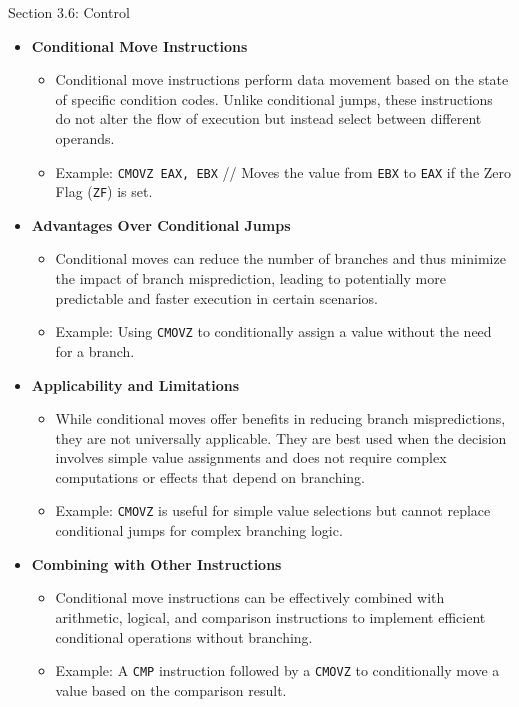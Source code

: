 \begin{notes}{Section 3.6: Control}
    \begin{itemize}
        \item \textbf{Conditional Move Instructions}
        \begin{itemize}
            \item Conditional move instructions perform data movement based on the state of specific condition codes. Unlike conditional jumps, these instructions do not alter the flow of execution 
            but instead select between different operands.
            \item Example: \texttt{CMOVZ EAX, EBX} // Moves the value from \texttt{EBX} to \texttt{EAX} if the Zero Flag (\texttt{ZF}) is set.
        \end{itemize}
        \item \textbf{Advantages Over Conditional Jumps}
        \begin{itemize}
            \item Conditional moves can reduce the number of branches and thus minimize the impact of branch misprediction, leading to potentially more predictable and faster execution in certain scenarios.
            \item Example: Using \texttt{CMOVZ} to conditionally assign a value without the need for a branch.
        \end{itemize}
        \item \textbf{Applicability and Limitations}
        \begin{itemize}
            \item While conditional moves offer benefits in reducing branch mispredictions, they are not universally applicable. They are best used when the decision involves simple value assignments 
            and does not require complex computations or effects that depend on branching.
            \item Example: \texttt{CMOVZ} is useful for simple value selections but cannot replace conditional jumps for complex branching logic.
        \end{itemize}
        \item \textbf{Combining with Other Instructions}
        \begin{itemize}
            \item Conditional move instructions can be effectively combined with arithmetic, logical, and comparison instructions to implement efficient conditional operations without branching.
            \item Example: A \texttt{CMP} instruction followed by a \texttt{CMOVZ} to conditionally move a value based on the comparison result.

\end{itemize}
\end{itemize}
\end{notes}
